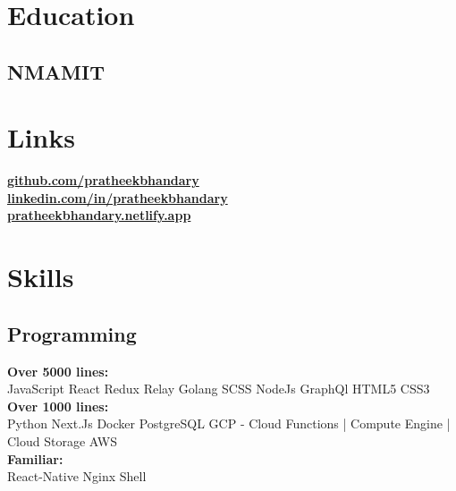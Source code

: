 \documentclass[]{deedy-resume-openfont}
\begin{document}
%
%
\lastupdated

%
%
%
%

\begin{minipage}[t]{0.25\textwidth} 


\section{Education} 

\subsection{NMAMIT}


\section{Links} 
\href{https://github.com/pratheekbhandary}{\bf github.com/pratheekbhandary} \\
\href{https://www.linkedin.com/in/pratheekbhandary}{\bf linkedin.com/in/pratheekbhandary} \\
\href{https://pratheekbhandary.netlify.app/}{\bf pratheekbhandary.netlify.app} 


\section{Skills}
\subsection{Programming}
\textbf{Over 5000 lines:}\\
JavaScript \textbullet{}React \textbullet{}Redux \textbullet{}Relay
Golang \textbullet{}SCSS \textbullet{}NodeJs \textbullet{} GraphQl
HTML5 \textbullet{} CSS3\\
\textbf{Over 1000 lines:}\\
Python \textbullet{} Next.Js \textbullet{} Docker \textbullet{} PostgreSQL 
GCP - Cloud Functions | Compute Engine | Cloud Storage \textbullet{} AWS\\
\textbf{Familiar:}\\
React-Native \textbullet{} Nginx \textbullet{} Shell
\sectionsep


\end{minipage}
\end{document}
